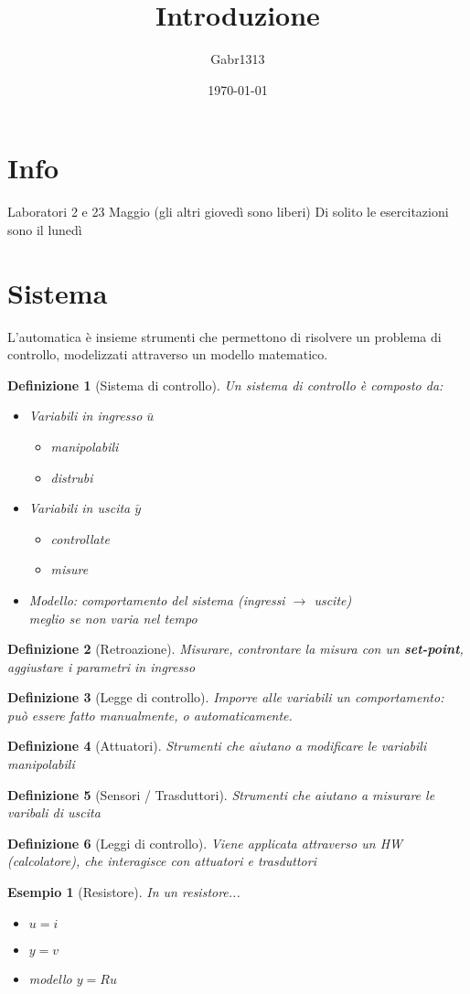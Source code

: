 \documentclass[12pt, a4paper]{article}
\title{Introduzione}
\author{Gabr1313}
\date{\today}
\theoremstyle{break}
\newtheorem*{definition}{Definizione}
\newtheorem*{example}{Esempio}
\begin{document}
\maketitle
\tableofcontents
\justify
\sloppy

\newpage
\section{Info}
Laboratori 2 e 23 Maggio (gli altri giovedì sono liberi)
Di solito le esercitazioni sono il lunedì

\section{Sistema}
L'automatica è insieme strumenti che permettono di risolvere un problema di 
controllo, modelizzati attraverso un modello matematico.
\begin{definition}[Sistema di controllo] Un sistema di controllo è composto 
    da:
    \begin{itemize}
        \item Variabili in ingresso $\bar{u}$
            \begin{itemize}
                \item manipolabili
                \item distrubi
            \end{itemize}
        \item Variabili in uscita $\bar{y}$
            \begin{itemize}
                \item controllate
                \item misure
            \end{itemize}
        \item Modello: comportamento del sistema (ingressi $\to$ uscite) \\
              meglio se non varia nel tempo
    \end{itemize}
\end{definition}
\begin{definition}[Retroazione]
    Misurare, controntare la misura con un \textbf{set-point}, aggiustare i
    parametri in ingresso
\end{definition}
\begin{definition}[Legge di controllo]
    Imporre alle variabili un comportamento: può essere fatto manualmente, o 
    automaticamente.
\end{definition}
\begin{definition}[Attuatori]
    Strumenti che aiutano a modificare le variabili manipolabili
\end{definition}
\begin{definition}[Sensori / Trasduttori]
    Strumenti che aiutano a misurare le varibali di uscita
\end{definition}
\begin{definition}[Leggi di controllo]
    Viene applicata attraverso un HW (calcolatore), che interagisce con
    attuatori e trasduttori
\end{definition}

\begin{example} [Resistore] 
    In un resistore...
    \begin{itemize}
        \item $u = i$
        \item $y = v$
        \item modello $y = Ru$
    \end{itemize}
\end{example}
\end{document}
